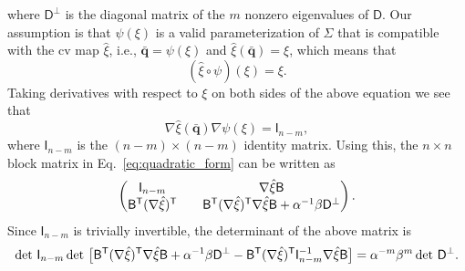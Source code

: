 %
where $\mathsf{D}^\perp$ is the diagonal matrix of the $m$ nonzero eigenvalues of $\mathsf{D}$.
Our assumption is that $\psi(\xi)$ is a valid parameterization of $\Sigma$ that is compatible with the \ac{cv} map $\hat{\xi}$, i.e., $\bar{\bm{q}} = \psi(\xi)$ and $\hat{\xi}(\bar{\bm{q}}) = \xi$, which means that
%
\begin{equation}
  (\hat{\xi}\circ\psi)(\xi) = \xi.
\end{equation}
%
Taking derivatives with respect to $\xi$ on both sides of the above equation we see that
%
\begin{equation}
  \nabla\hat{\xi}(\bar{\bm{q}})\nabla\psi(\xi) = \mathsf{I}_{n-m},
\end{equation}
%
where $\mathsf{I}_{n-m}$ is the $(n-m)\times(n-m)$ identity matrix.
Using this, the $n\times n$ block matrix in Eq.~\eqref{eq:quadratic_form} can be written as
%
\begin{equation}
  \begin{pmatrix}
    \mathsf{I}_{n-m} &
    \quad\nabla\hat{\xi}\mathsf{B}\\
    \mathsf{B}^\mathsf{T}(\nabla\hat{\xi})^\mathsf{T} &
    \quad\mathsf{B}^\mathsf{T}(\nabla\hat{\xi})^\mathsf{T}\nabla\hat{\xi}\mathsf{B} + \alpha^{-1}\beta\mathsf{D}^\perp
  \end{pmatrix}.
\end{equation}
%
Since $\mathsf{I}_{n-m}$ is trivially invertible, the determinant of the above matrix is
%
\begin{equation}
  \det\,\mathsf{I}_{n-m}\det\,\big[\mathsf{B} \trans(\nabla\hat{\xi})\trans\nabla\hat{\xi}\mathsf{B}  + \alpha^{-1}\beta\mathsf{D}^\perp - \mathsf{B}\trans(\nabla\hat{\xi})\trans\mathsf{I}^{-1}_{n-m}\nabla\hat{\xi}\mathsf{B}\big]
  =
  \alpha^{-m}\beta^m \det\,\mathsf{D}^\perp.
  \label{eq:determinant}
\end{equation}

